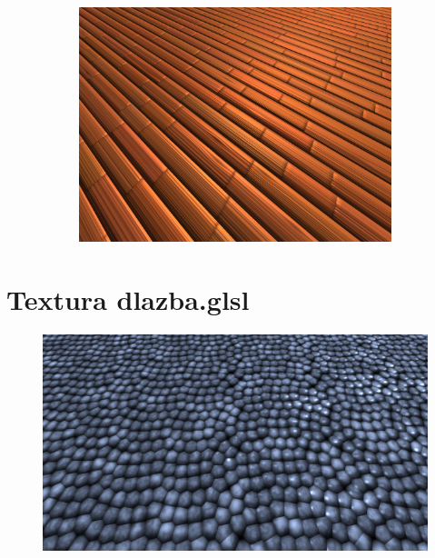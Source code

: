 \documentclass[12pt,a4paper,titlepage,final]{report}
\begin{document}
\begin{figure}[h]
	\begin{subfigure}[b]{0.60\textwidth}
		\captionsetup{type=figure}
		\includegraphics[width=\textwidth]{images/drevo-full.png}
		\label{fig:drevo-full}
	\end{subfigure}
\end{figure}

\section{Textura dlazba.glsl}

\begin{figure}[h]
	\centering
	\captionsetup{type=figure}
	\includegraphics[width=\textwidth]{images/dlazba.png}
\end{figure} 
\end{document}
